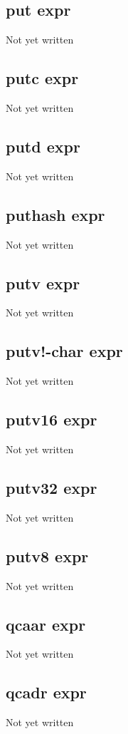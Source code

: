 \documentclass[a4paper,11pt]{article}
\begin{document}
\subsection{\ttfamily put expr}
Not yet written

\subsection{\ttfamily putc expr}
Not yet written

\subsection{\ttfamily putd expr}
Not yet written

\subsection{\ttfamily puthash expr}
Not yet written

\subsection{\ttfamily putv expr}
Not yet written

\subsection{\ttfamily putv!-char expr}
Not yet written

\subsection{\ttfamily putv16 expr}
Not yet written

\subsection{\ttfamily putv32 expr}
Not yet written

\subsection{\ttfamily putv8 expr}
Not yet written

\subsection{\ttfamily qcaar expr}
Not yet written

\subsection{\ttfamily qcadr expr}
Not yet written
\end{document}
